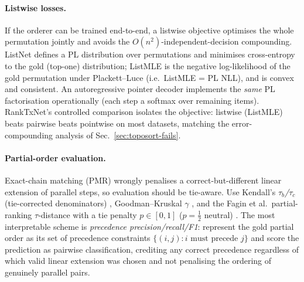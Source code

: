 \paragraph{Listwise losses.} If the orderer can be trained end-to-end, a listwise
objective optimises the whole permutation jointly and avoids the
$O(n^2)$-independent-decision compounding. ListNet \citep{ord:cao2007listnet}
defines a PL distribution over permutations and minimises cross-entropy to the
gold (top-one) distribution; ListMLE \citep{ord:xia2008listmle} is the negative
log-likelihood of the gold permutation under Plackett--Luce (i.e.\ ListMLE = PL
NLL), and is convex and consistent. An autoregressive pointer decoder implements
the \emph{same} PL factorisation operationally (each step a softmax over remaining
items). RankTxNet's controlled comparison \citep{ord:kumar2020ranktxnet} isolates
the objective: listwise (ListMLE) beats pairwise beats pointwise on most datasets,
matching the error-compounding analysis of Sec.~\ref{sec:toposort-fails}.

\paragraph{Partial-order evaluation.} Exact-chain matching (PMR) wrongly penalises
a correct-but-different linear extension of parallel steps, so evaluation should
be tie-aware. Use Kendall's \emph{$\tau_b$/$\tau_c$} (tie-corrected
denominators) \citep{ord:kendall1938}, Goodman--Kruskal $\gamma$
\citep{ord:goodman1954}, and the Fagin et al.\ partial-ranking $\tau$-distance
with a tie penalty $p\in[0,1]$ ($p=\tfrac12$ neutral)
\citep{ord:fagin2006partial,ord:fagin2003topk}. The most interpretable scheme is
\emph{precedence precision/recall/F1}: represent the gold partial order as its set
of precedence constraints $\{(i,j): i \text{ must precede } j\}$ and score the
prediction as pairwise classification, crediting any correct precedence regardless
of which valid linear extension was chosen and not penalising the ordering of
genuinely parallel pairs.

